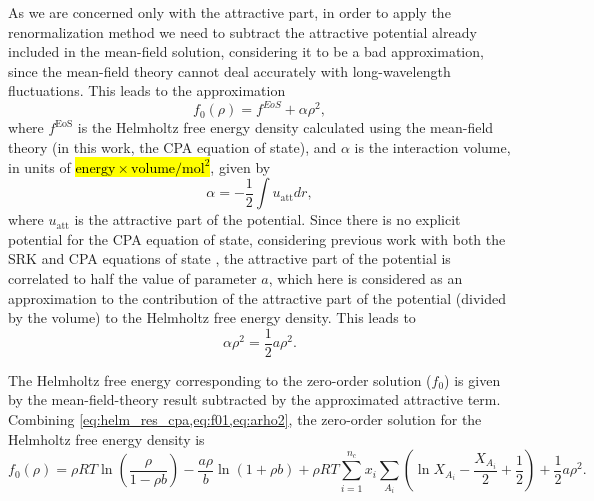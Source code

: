 \documentclass[preprint,12pt,3p]{elsarticle}
\begin{document}
As we are concerned only with the attractive part, in order to apply the renormalization method we need to subtract the attractive potential already included in the mean-field solution, considering it to be a bad approximation, since the mean-field theory cannot deal accurately with long-wavelength fluctuations.
This leads to the approximation
\begin{equation} \label{eq:f01}
f_{0}(\rho) = f^{EoS} + \alpha\rho^2,
\end{equation}
where $f^\text{EoS}$ is the Helmholtz free energy density calculated using the mean-field theory (in this work, the CPA equation of state), and $\alpha$ is the interaction volume, in units of \hl{$\mathrm{energy \times volume/mol^2}$}, given by
\begin{equation} \label{eq:alphav}
\alpha = -\frac{1}{2} \int u_\text{att} dr,
\end{equation}
where $u_\text{att}$ is the attractive part of the potential.
Since there is no explicit potential for the CPA equation of state, considering previous work with both the SRK and CPA equations of state \cite{cai2004thermodynamics, pcm2017application, xu2010crossover}, the attractive part of the potential is correlated to half the value of parameter $a$, which here is considered as an approximation to the contribution of the attractive part of the potential (divided by the volume) to the Helmholtz free energy density.
This leads to
\begin{equation} \label{eq:arho2}
\alpha\rho^2 = \frac{1}{2}a\rho^2.
\end{equation}

The Helmholtz free energy corresponding to the zero-order solution ($f_{0}$) is given by the mean-field-theory result subtracted by the approximated attractive term.
Combining \cref{eq:helm_res_cpa,eq:f01,eq:arho2}, the zero-order solution for the Helmholtz free energy density is
\begin{equation} \label{eq:f00}
f_{0}(\rho) = \rho RT\ln\left(\frac{\rho}{1-\rho b}\right)-\frac{a\rho}{b}\ln(1+\rho b) + \rho RT\sum_{i=1}^{n_c} x_{i} \sum_{A_{i}}\left(\ln X_{A_{i}} - \frac{X_{A_{i}}}{2} + \frac{1}{2}\right) + \frac{1}{2} a\rho^2.
\end{equation}  
\end{document}

